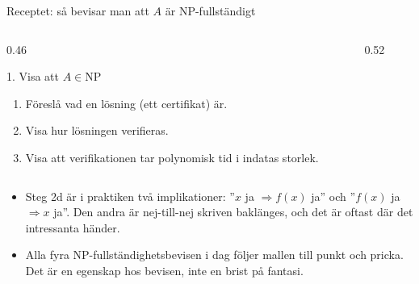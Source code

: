 \documentclass[aspectratio=169,10pt]{beamer}
\begin{document}
\begin{frame}{Receptet: så bevisar man att $A$ är NP-fullständigt}
  \begin{columns}[T]
    \begin{column}{0.46\textwidth}
      \begin{block}{1. Visa att $A\in\mathrm{NP}$}
        \begin{enumerate}
          \item[a)] Föreslå vad en lösning (ett certifikat) är.
          \item[b)] Visa hur lösningen verifieras.
          \item[c)] Visa att verifikationen tar polynomisk tid i indatas storlek.
        \end{enumerate}
      \end{block}
    \end{column}
    \begin{column}{0.52\textwidth}
    \end{column}
  \end{columns}
  \vspace{2mm}
  \begin{itemize}
    \item<3-> Steg 2d är i praktiken två implikationer: ''$x$ ja $\Rightarrow f(x)$ ja'' och ''$f(x)$ ja $\Rightarrow x$ ja''. Den andra är nej-till-nej skriven baklänges, och det är oftast där det intressanta händer.
    \item<4-> Alla fyra NP-fullständighetsbevisen i dag följer mallen till punkt och pricka. Det är en egenskap hos bevisen, inte en brist på fantasi.
  \end{itemize}
\end{frame}
\end{document}
